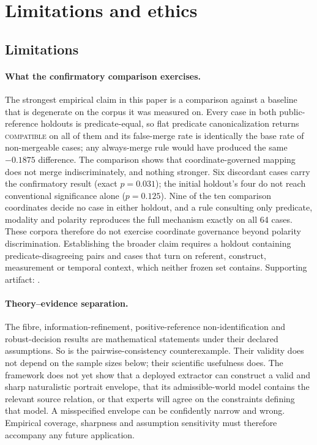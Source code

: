 \section{Limitations and ethics}
\label{sec:limitations}

\subsection{Limitations}

\paragraph{What the confirmatory comparison exercises.}
The strongest empirical claim in this paper is a comparison against a baseline
that is degenerate on the corpus it was measured on. Every case in both
public-reference holdouts is predicate-equal, so flat predicate canonicalization
returns \textsc{compatible} on all of them and its false-merge rate is
identically the base rate of non-mergeable cases; any always-merge rule would
have produced the same $-0.1875$ difference. The comparison shows that
coordinate-governed mapping does not merge indiscriminately, and nothing
stronger. Six discordant cases carry the confirmatory result (exact $p=0.031$);
the initial holdout's four do not reach conventional significance alone
($p=0.125$). Nine of the ten comparison coordinates decide no case in either
holdout, and a rule consulting only predicate, modality and polarity reproduces
the full mechanism exactly on all 64 cases. These corpora therefore do not
exercise coordinate governance beyond polarity discrimination. Establishing the
broader claim requires a holdout containing predicate-disagreeing pairs and
cases that turn on referent, construct, measurement or temporal context, which
neither frozen set contains. Supporting artifact:
.

\paragraph{Theory--evidence separation.}
The fibre, information-refinement, positive-reference non-identification and
robust-decision results are mathematical statements under their declared
assumptions. So is the pairwise-consistency counterexample. Their validity does
not depend on the sample sizes below; their scientific usefulness does. The framework does not yet show
that a deployed extractor can construct a valid and sharp naturalistic
portrait envelope, that its admissible-world model contains the relevant
source relation, or that experts will agree on the constraints defining that
model. A misspecified envelope can be confidently narrow and wrong. Empirical
coverage, sharpness and assumption sensitivity must therefore accompany any
future application.


